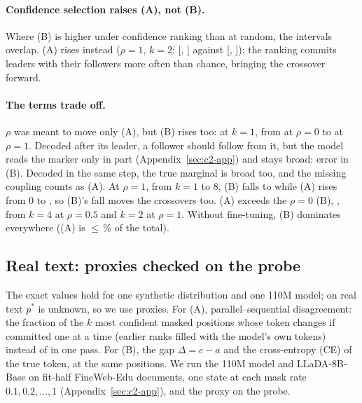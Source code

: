 \paragraph{Confidence selection raises (A), not (B).}
Where (B) is higher under confidence ranking than at random, the intervals overlap. (A) rises instead ($\rho=1$, $k=2$:
\CTwoConfAatRhoOneKTwo{} [\CTwoConfAatRhoOneKTwoLo, \CTwoConfAatRhoOneKTwoHi] against
\CTwoRandAatRhoOneKTwo{} [\CTwoRandAatRhoOneKTwoLo, \CTwoRandAatRhoOneKTwoHi]): the ranking commits
leaders with their followers more often than chance, bringing the crossover forward.

\paragraph{The terms trade off.}
$\rho$ was meant to move only (A), but (B) rises too: at $k=1$, from \CTwoConfBatRhoZeroKOne{}
at $\rho=0$ to \CTwoConfBatRhoOneKOne{} at $\rho=1$. Decoded after its leader, a follower should follow from it, but the model reads the marker
only in part (Appendix~\ref{sec:c2-app}) and stays broad: error in (B). Decoded in the same
step, the true marginal is broad too, and the missing coupling counts as (A). At $\rho=1$, from $k=1$ to $8$, (B) falls to
\CTwoConfBatRhoOneKEight{} while (A) rises from $0$ to \CTwoConfAatRhoOneKEight, so (B)'s fall moves the crossovers too.
(A) exceeds the $\rho=0$ (B), \CTwoConfBatRhoZeroKOne{}, from $k=4$ at $\rho=0.5$ and $k=2$ at $\rho=1$. Without
fine-tuning, (B) dominates everywhere ((A) is ${\le}\,$\CTwoUntunedConfShareAMax\% of the
total).

\subsection{Real text: proxies checked on the probe}
\label{sec:c2-text}

The exact values hold for one synthetic distribution and one 110M model; on real text $p^*$
is unknown, so we use proxies. For (A), parallel--sequential disagreement: the fraction of the
$k$ most confident masked positions whose token changes if committed one at a time (earlier
ranks filled with the model's own tokens) instead of in one pass. For (B), the gap
$\Delta=c-a$ and the cross-entropy (CE) of the true token, at the same positions.
We run the 110M model and LLaDA-8B-Base on
\CTwoTTenNDocs{} fit-half FineWeb-Edu documents, one state at each
mask rate $0.1, 0.2, \dots, 1$ (Appendix~\ref{sec:c2-app}), and the proxy on the probe.

